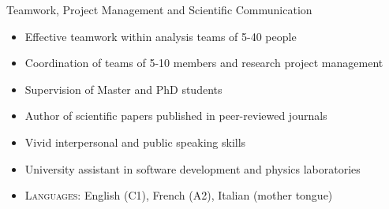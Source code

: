 \begin{cvskills}
\cvskill
{Teamwork, Project Management and Scientific Communication} %
{
\begin{minipage}{0.49\textwidth}
\begin{itemize}[labelwidth=\the\widest,align=right,leftmargin=!,labelsep=1pt,noitemsep]
\item[\custItem] Effective teamwork within analysis teams of 5-40 people
\item[\custItem] Coordination of teams of 5-10 members and research project
management
\item[\custItem] Supervision of Master and PhD students
\end{itemize}
\end{minipage}
\hfill
\begin{minipage}{0.49\textwidth}
\begin{itemize}[labelwidth=\the\widest,align=right,leftmargin=!,labelsep=1pt,noitemsep]
\item[\custItem] Author of scientific papers published in peer-reviewed
journals
\item[\custItem] Vivid interpersonal and public speaking skills
\item[\custItem] University assistant in software development and physics
laboratories
\end{itemize}
\end{minipage}
\begin{itemize}[labelwidth=\the\widest,align=right,leftmargin=!,labelsep=1pt,noitemsep]
\item[] \textsc{\color{awesome}Languages:} English (C1), French (A2),
Italian (mother tongue)
\end{itemize}
}
%

\end{cvskills}

